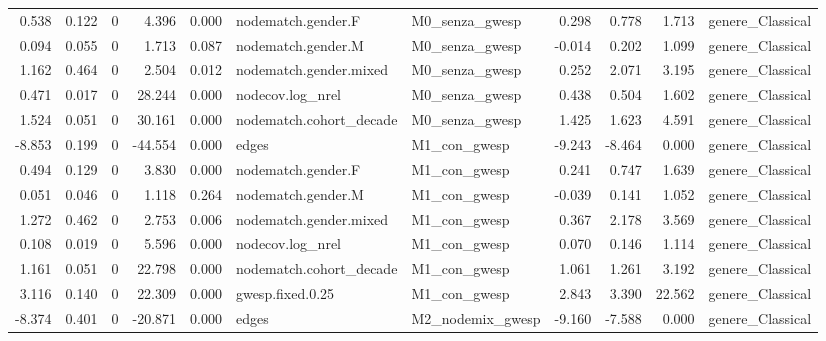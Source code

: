 \begin{table}
\begin{tabular}{rrrrrllrrrl}
    0.538 & 0.122 &        0 &    4.396 &     0.000 &      nodematch.gender.F &   M0\_senza\_gwesp &   0.298 &   0.778 &   1.713 &            genere\_Classical \\
    0.094 & 0.055 &        0 &    1.713 &     0.087 &      nodematch.gender.M &   M0\_senza\_gwesp &  -0.014 &   0.202 &   1.099 &            genere\_Classical \\
    1.162 & 0.464 &        0 &    2.504 &     0.012 &  nodematch.gender.mixed &   M0\_senza\_gwesp &   0.252 &   2.071 &   3.195 &            genere\_Classical \\
    0.471 & 0.017 &        0 &   28.244 &     0.000 &        nodecov.log\_nrel &   M0\_senza\_gwesp &   0.438 &   0.504 &   1.602 &            genere\_Classical \\
    1.524 & 0.051 &        0 &   30.161 &     0.000 & nodematch.cohort\_decade &   M0\_senza\_gwesp &   1.425 &   1.623 &   4.591 &            genere\_Classical \\
   -8.853 & 0.199 &        0 &  -44.554 &     0.000 &                   edges &     M1\_con\_gwesp &  -9.243 &  -8.464 &   0.000 &            genere\_Classical \\
    0.494 & 0.129 &        0 &    3.830 &     0.000 &      nodematch.gender.F &     M1\_con\_gwesp &   0.241 &   0.747 &   1.639 &            genere\_Classical \\
    0.051 & 0.046 &        0 &    1.118 &     0.264 &      nodematch.gender.M &     M1\_con\_gwesp &  -0.039 &   0.141 &   1.052 &            genere\_Classical \\
    1.272 & 0.462 &        0 &    2.753 &     0.006 &  nodematch.gender.mixed &     M1\_con\_gwesp &   0.367 &   2.178 &   3.569 &            genere\_Classical \\
    0.108 & 0.019 &        0 &    5.596 &     0.000 &        nodecov.log\_nrel &     M1\_con\_gwesp &   0.070 &   0.146 &   1.114 &            genere\_Classical \\
    1.161 & 0.051 &        0 &   22.798 &     0.000 & nodematch.cohort\_decade &     M1\_con\_gwesp &   1.061 &   1.261 &   3.192 &            genere\_Classical \\
    3.116 & 0.140 &        0 &   22.309 &     0.000 &        gwesp.fixed.0.25 &     M1\_con\_gwesp &   2.843 &   3.390 &  22.562 &            genere\_Classical \\
   -8.374 & 0.401 &        0 &  -20.871 &     0.000 &                   edges & M2\_nodemix\_gwesp &  -9.160 &  -7.588 &   0.000 &            genere\_Classical \\

\end{tabular}
\end{table}
